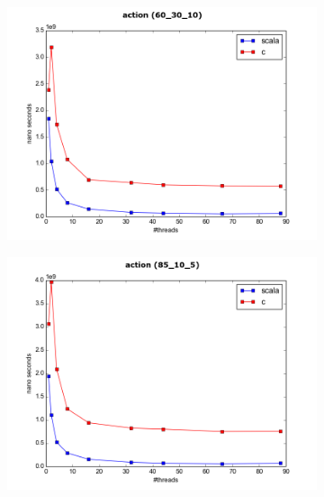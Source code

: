 \documentclass[conference]{IEEEtran}
\begin{document}
	\begin{figure}
		\begin{subfigure}{.5\textwidth}
			\includegraphics[width=0.45\paperwidth]{vs_scala/action_60_30_10.png}
			\label{fig:c_vs_scala_60_30_10}
		\end{subfigure}
		\begin{subfigure}{.5\textwidth}
			\includegraphics[width=0.45\paperwidth]{vs_scala/action_85_10_5.png}
			\label{fig:c_vs_scala_85_10_5}
		\end{subfigure}
		\begin{subfigure}{.5\textwidth}

\end{subfigure}
\end{figure}
\end{document}
